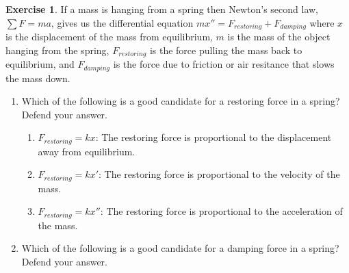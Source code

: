 \documentclass[
]{book}
\providecommand{\tightlist}{%
  \setlength{\itemsep}{0pt}\setlength{\parskip}{0pt}}
\theoremstyle{definition}
\theoremstyle{definition}
\theoremstyle{definition}
\newtheorem{exercise}{Exercise}[chapter]
\theoremstyle{remark}
\begin{document}
\begin{exercise}
\protect\hypertarget{exr:euler-multi-dimensional}{}{\label{exr:euler-multi-dimensional} }If a mass is hanging from a spring then Newton's second law, \(\sum F=ma\), gives us the differential equation \(mx'' = F_{restoring} + F_{damping}\) where \(x\) is the displacement of the mass from equilibrium, \(m\) is the mass of the object hanging from the spring, \(F_{restoring}\) is the force pulling the mass back to equilibrium, and \(F_{damping}\) is the force due to friction or air resitance that slows the mass down.

\begin{enumerate}
\def\labelenumi{\alph{enumi}.}
\tightlist
\item
  Which of the following is a good candidate for a restoring force in a spring? Defend your answer.

  \begin{enumerate}
  \def\labelenumii{\roman{enumii}.}
  \tightlist
  \item
    \(F_{restoring} = kx\): The restoring force is proportional to the displacement away from equilibrium.
  \item
    \(F_{restoring} = kx'\): The restoring force is proportional to the velocity of the mass.
  \item
    \(F_{restoring} = kx''\): The restoring force is proportional to the acceleration of the mass.
  \end{enumerate}
\item
  Which of the following is a good candidate for a damping force in a spring? Defend your answer.


\end{enumerate}
\end{exercise}
\end{document}
